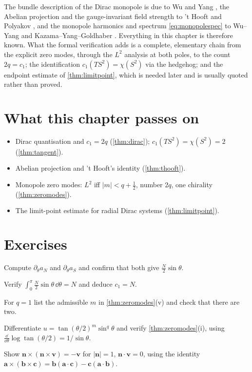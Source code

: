 \begin{litbox}
The bundle description of the Dirac monopole is due to Wu and Yang \cite{WuYang1975}, the Abelian projection and the gauge-invariant field strength to 't Hooft and Polyakov \cite{tHooft1974,Polyakov1974}, and the monopole harmonics and spectrum \eqref{eq:monopolespec} to Wu--Yang and Kazama--Yang--Goldhaber \cite{KazamaYangGoldhaber1977}. Everything in this chapter is therefore known. What the formal verification adds is a complete, elementary chain from the explicit zero modes, through the $L^2$ analysis at both poles, to the count $2q=c_1$; the identification $c_1(TS^2)=\chi(S^2)$ via the hedgehog; and the endpoint estimate of \cref{thm:limitpoint}, which is needed later and is usually quoted rather than proved.
\end{litbox}

\section*{What this chapter passes on}
\begin{itemize}[nosep]
\item Dirac quantisation and $c_1=2q$ (\cref{thm:dirac}); $c_1(TS^2)=\chi(S^2)=2$ (\cref{thm:tangent}).
\item Abelian projection and 't Hooft's identity (\cref{thm:thooft}).
\item Monopole zero modes: $L^2$ iff $|m|<q+\frac12$, number $2q$, one chirality (\cref{thm:zeromodes}).
\item The limit-point estimate for radial Dirac systems (\cref{thm:limitpoint}).
\end{itemize}

\section*{Exercises}
\begin{exercise}
Compute $\partial_\theta a_N$ and $\partial_\theta a_S$ and confirm that both give $\frac N2\sin\theta$.
\end{exercise}
\begin{exercise}
Verify $\int_0^\pi\frac N2\sin\theta\,\dd\theta=N$ and deduce $c_1=N$.
\end{exercise}
\begin{exercise}
For $q=1$ list the admissible $m$ in \cref{thm:zeromodes}(v) and check that there are two.
\end{exercise}
\begin{exercise}
Differentiate $u=\tan(\theta/2)^m\sin^q\theta$ and verify \cref{thm:zeromodes}(i), using $\frac{\dd}{\dd\theta}\log\tan(\theta/2)=1/\sin\theta$.
\end{exercise}
\begin{exercise}
Show $\mathbf n\times(\mathbf n\times\mathbf v)=-\mathbf v$ for $|\mathbf n|=1$, $\mathbf n\cdot\mathbf v=0$, using the identity $\mathbf a\times(\mathbf b\times\mathbf c)=\mathbf b(\mathbf a\cdot\mathbf c)-\mathbf c(\mathbf a\cdot\mathbf b)$.
\end{exercise}

